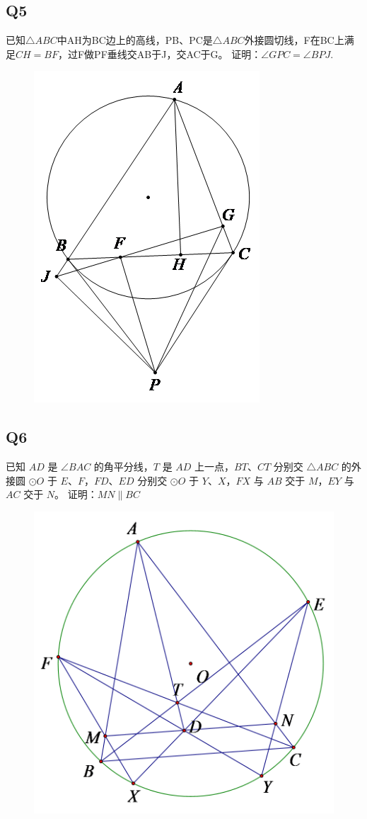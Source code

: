 \documentclass{article}
\begin{document}
\subsection{Q5}
已知$\triangle ABC$中AH为BC边上的高线，PB、PC是$\triangle ABC$外接圆切线，F在BC上满足$CH=BF$，过F做PF垂线交AB于J，交AC于G。
证明：$\angle GPC=\angle BPJ.$
\begin{figure}[htbp]
    \centering
    \includegraphics[width=0.4\linewidth]{figures/Q5.png}
\end{figure}

\newpage
\subsection{Q6}
已知 $AD$ 是 $\angle BAC$ 的角平分线，$T$ 是 $AD$ 上一点，$BT$、$CT$ 分别交 $\triangle ABC$ 的外接圆 $\odot O$ 于 $E$、$F$，$FD$、$ED$ 分别交 $\odot O$ 于 $Y$、$X$，$FX$ 与 $AB$ 交于 $M$，$EY$ 与 $AC$ 交于 $N$。
证明：$MN \parallel BC$
\begin{figure}[htbp]
    \centering
    \includegraphics[width=0.5\linewidth]{figures/Q6.png}
\end{figure}
\end{document}
